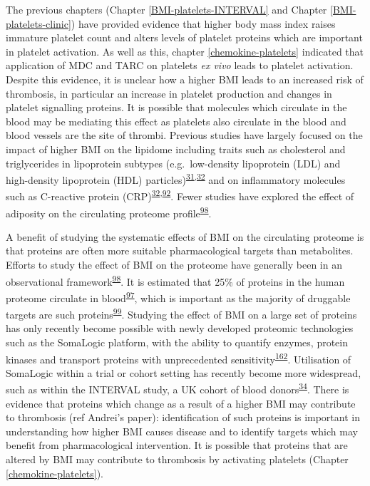 \documentclass[11pt,twoside]{bristolthesis}
\begin{document}
The previous chapters (Chapter \ref{BMI-platelets-INTERVAL} and Chapter \ref{BMI-platelets-clinic}) have provided evidence that higher body mass index raises immature platelet count and alters levels of platelet proteins which are important in platelet activation. As well as this, chapter \ref{chemokine-platelets} indicated that application of MDC and TARC on platelets \emph{ex vivo} leads to platelet activation. Despite this evidence, it is unclear how a higher BMI leads to an increased risk of thrombosis, in particular an increase in platelet production and changes in platelet signalling proteins. It is possible that molecules which circulate in the blood may be mediating this effect as platelets also circulate in the blood and blood vessels are the site of thrombi. Previous studies have largely focused on the impact of higher BMI on the lipidome including traits such as cholesterol and triglycerides in lipoprotein subtypes (e.g.~low-density lipoprotein (LDL) and high-density lipoprotein (HDL) particles)\textsuperscript{\protect\hyperlink{ref-Bell2018a}{31},\protect\hyperlink{ref-Wurtz2014}{32}} and on inflammatory molecules such as C-reactive protein (CRP)\textsuperscript{\protect\hyperlink{ref-Wurtz2014}{32},\protect\hyperlink{ref-Timpson2011}{92}}. Fewer studies have explored the effect of adiposity on the circulating proteome profile\textsuperscript{\protect\hyperlink{ref-Cominetti2018}{98}}.

A benefit of studying the systematic effects of BMI on the circulating proteome is that proteins are often more suitable pharmacological targets than metabolites. Efforts to study the effect of BMI on the proteome have generally been in an observational framework\textsuperscript{\protect\hyperlink{ref-Cominetti2018}{98}}. It is estimated that 25\% of proteins in the human proteome circulate in blood\textsuperscript{\protect\hyperlink{ref-Gold2012}{97}}, which is important as the majority of druggable targets are such proteins\textsuperscript{\protect\hyperlink{ref-Imming2006}{99}}. Studying the effect of BMI on a large set of proteins has only recently become possible with newly developed proteomic technologies such as the SomaLogic platform, with the ability to quantify enzymes, protein kinases and transport proteins with unprecedented sensitivity\textsuperscript{\protect\hyperlink{ref-Rohloff2014}{162}}. Utilisation of SomaLogic within a trial or cohort setting has recently become more widespread, such as within the INTERVAL study, a UK cohort of blood donors\textsuperscript{\protect\hyperlink{ref-Sun2018}{34}}. There is evidence that proteins which change as a result of a higher BMI may contribute to thrombosis (ref Andrei's paper): identification of such proteins is important in understanding how higher BMI causes disease and to identify targets which may benefit from pharmacological intervention. It is possible that proteins that are altered by BMI may contribute to thrombosis by activating platelets (Chapter \ref{chemokine-platelets}).
\end{document}

